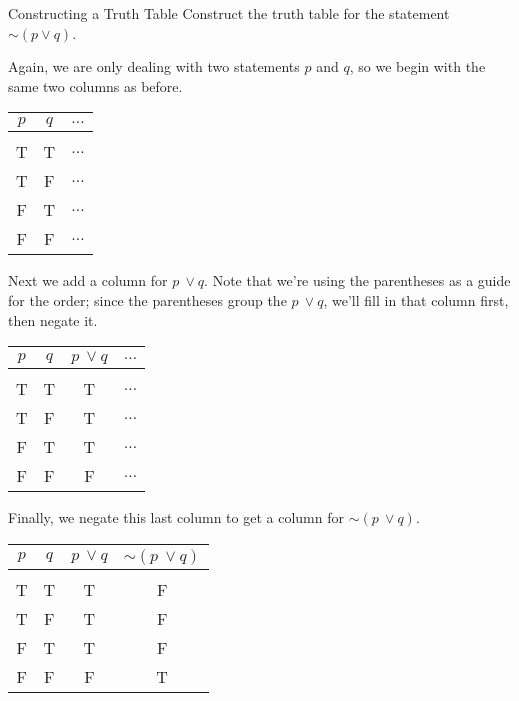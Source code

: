 \begin{example}[https://www.youtube.com/watch?v=nzBClGWo8Po]{Constructing a Truth Table}
Construct the truth table for the statement $\sim (p \vee q)$.

\sol
Again, we are only dealing with two statements $p$ and $q$, so we begin with the same two columns as before.
\begin{center}
\begin{tabular}{|c c c|}
\hline
$p$ & $q$ & $\ldots$\\
\hline
& &\\
T & T & $\ldots$\\
T & F & $\ldots$\\
F & T & $\ldots$\\
F & F & $\ldots$\\
\hline
\end{tabular}
\end{center}

Next we add a column for $p\ \vee q$.  Note that we're using the parentheses as a guide for the order; since the parentheses group the $p\ \vee q$, we'll fill in that column first, then negate it.
\begin{center}
\begin{tabular}{|c c c c|}
\hline
$p$ & $q$ & $p\ \vee q$ & $\ldots$\\
\hline
& & &\\
T & T & T & $\ldots$\\
T & F & T & $\ldots$\\
F & T & T & $\ldots$\\
F & F & F & $\ldots$\\
\hline
\end{tabular}
\end{center}

Finally, we negate this last column to get a column for $\sim (p\ \vee q)$.
\begin{center}
{\color{green!30!black}
\begin{tabular}{|c c c c|}
\hline
$p$ & $q$ & $p\ \vee q$ & $\sim (p\ \vee q)$\\
\hline
& & &\\
T & T & T & F\\
T & F & T & F\\
F & T & T & F\\
F & F & F & T\\
\hline
\end{tabular}}
\end{center}
\end{example}
\vfill

